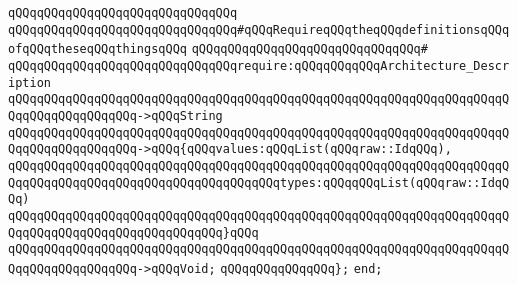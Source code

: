 \verb|qQQqqQQqqQQqqQQqqQQqqQQqqQQqqQQq|\newline
\verb|qQQqqQQqqQQqqQQqqQQqqQQqqQQqqQQq#qQQqRequireqQQqtheqQQqdefinitionsqQQqofqQQqtheseqQQqthingsqQQq|\newline
\verb|qQQqqQQqqQQqqQQqqQQqqQQqqQQqqQQq#|\newline
\verb|qQQqqQQqqQQqqQQqqQQqqQQqqQQqqQQqrequire:qQQqqQQqqQQqArchitecture_Description|\newline
\verb|qQQqqQQqqQQqqQQqqQQqqQQqqQQqqQQqqQQqqQQqqQQqqQQqqQQqqQQqqQQqqQQqqQQqqQQqqQQqqQQqqQQqqQQq->qQQqString|\newline
\verb|qQQqqQQqqQQqqQQqqQQqqQQqqQQqqQQqqQQqqQQqqQQqqQQqqQQqqQQqqQQqqQQqqQQqqQQqqQQqqQQqqQQqqQQq->qQQq{qQQqvalues:qQQqList(qQQqraw::IdqQQq),|\newline
\verb|qQQqqQQqqQQqqQQqqQQqqQQqqQQqqQQqqQQqqQQqqQQqqQQqqQQqqQQqqQQqqQQqqQQqqQQqqQQqqQQqqQQqqQQqqQQqqQQqqQQqqQQqqQQqtypes:qQQqqQQqList(qQQqraw::IdqQQq)|\newline
\verb|qQQqqQQqqQQqqQQqqQQqqQQqqQQqqQQqqQQqqQQqqQQqqQQqqQQqqQQqqQQqqQQqqQQqqQQqqQQqqQQqqQQqqQQqqQQqqQQqqQQq}qQQq|\newline
\verb|qQQqqQQqqQQqqQQqqQQqqQQqqQQqqQQqqQQqqQQqqQQqqQQqqQQqqQQqqQQqqQQqqQQqqQQqqQQqqQQqqQQqqQQq->qQQqVoid;|\newline
\newline
\verb|qQQqqQQqqQQqqQQq};|\newline
\verb|end;|\newline

